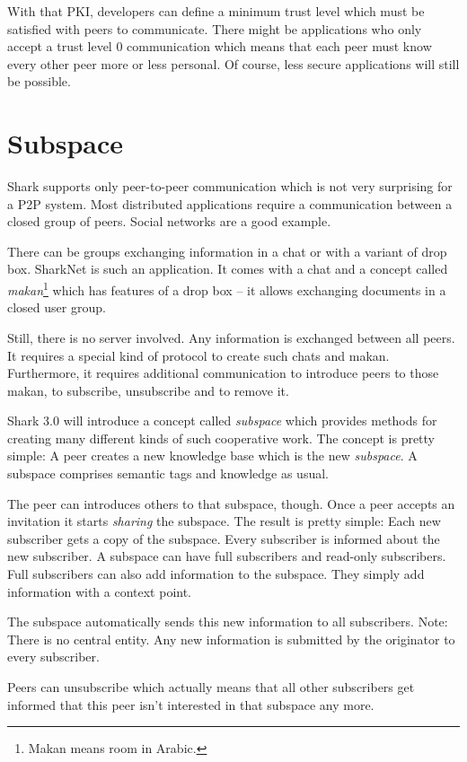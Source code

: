 With that PKI, developers can define a minimum trust level which must be satisfied with peers to communicate. There might be applications who only accept a trust level 0 communication which means that each peer must know every other peer more or less personal. Of course, less secure applications will still be possible.

\section{Subspace}
Shark supports only peer-to-peer communication which is not very surprising for a P2P system. Most distributed applications require a communication between a closed group of peers. Social networks are a good example.

There can be groups exchanging information in a chat or with a variant of drop box. SharkNet is such an application. It comes with a chat and a concept called {\it makan}\footnote{Makan means room in Arabic.} which has features of a drop box -- it allows exchanging documents in a closed user group.

Still, there is no server involved. Any information is exchanged between all peers. It requires a special kind of protocol to create such chats and makan. Furthermore, it requires additional communication to introduce peers to those makan, to subscribe, unsubscribe and to remove it.

Shark 3.0 will introduce a concept called {\it subspace} which provides methods for creating many different kinds of such cooperative work. The concept is pretty simple: A peer creates a new knowledge base which is the new {\it subspace}.
A subspace comprises semantic tags and knowledge as usual.

The peer can introduces others to that subspace, though. Once a peer accepts an invitation it starts {\it sharing} the subspace. The result is pretty simple: Each new subscriber gets a copy of the subspace. Every subscriber is informed about the new subscriber. A subspace can have full subscribers and read-only subscribers. Full subscribers can also add information to the subspace. They simply add information with a context point.

The subspace automatically sends this new information to all subscribers. Note: There is no central entity. Any new information is submitted by the originator to every subscriber.

Peers can unsubscribe which actually means that all other subscribers get informed that this peer isn't interested in that subspace any more.

